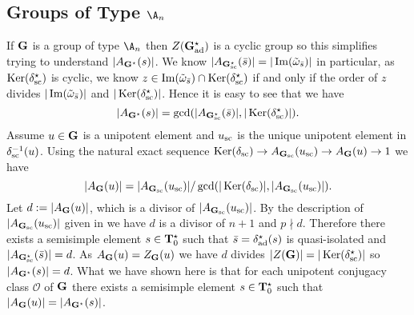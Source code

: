 \documentclass[eqthmnum]{jt-calcs}
\begin{document}
\subsection{\texorpdfstring{Groups of Type $\A_n$}{Groups of Type A}}
\begin{pa}\label{sec:comp-orders-type-A}
If $\mathbf{G}$ is a group of type $\A_n$ then $Z(\mathbf{G}_{\operatorname{ad}}^{\star})$ is a cyclic group so this simplifies trying to understand $|A_{\mathbf{G}^{\star}}(s)|$. We know $|A_{\mathbf{G}_{\operatorname{sc}}^{\star}}(\bar{s})| = |\operatorname{Im}(\tilde{\omega}_{\bar{s}})|$ in particular, as $\operatorname{Ker}(\delta_{\operatorname{sc}}^{\star})$ is cyclic, we know $z \in \operatorname{Im}(\tilde{\omega}_{\bar{s}}) \cap \operatorname{Ker}(\delta_{\operatorname{sc}}^{\star})$ if and only if the order of $z$ divides $|\operatorname{Im}(\tilde{\omega}_{\bar{s}})|$ and $|\operatorname{Ker}(\delta_{\operatorname{sc}}^{\star})|$. Hence it is easy to see that we have
\begin{equation*}
|A_{\mathbf{G}^{\star}}(s)| = \gcd(|A_{\mathbf{G}_{\operatorname{sc}}^{\star}}(\bar{s})|,|\operatorname{Ker}(\delta_{\operatorname{sc}}^{\star})|).
\end{equation*}
Assume $u \in \mathbf{G}$ is a unipotent element and $u_{\operatorname{sc}}$ is the unique unipotent element in $\delta_{\operatorname{sc}}^{-1}(u)$. Using the natural exact sequence $\operatorname{Ker}(\delta_{\operatorname{sc}}) \to A_{\mathbf{G}_{\operatorname{sc}}}(u_{\operatorname{sc}}) \to A_{\mathbf{G}}(u) \to 1$ we have
\begin{equation*}
|A_{\mathbf{G}}(u)| = |A_{\mathbf{G}_{\operatorname{sc}}}(u_{\operatorname{sc}})|/\gcd(|\operatorname{Ker}(\delta_{\operatorname{sc}})|,|A_{\mathbf{G}_{\operatorname{sc}}}(u_{\operatorname{sc}})|).
\end{equation*}
Let $d := |A_{\mathbf{G}}(u)|$, which is a divisor of $|A_{\mathbf{G}_{\operatorname{sc}}}(u_{\operatorname{sc}})|$. By the description of $|A_{\mathbf{G}_{\operatorname{sc}}}(u_{\operatorname{sc}})|$ given in \cite[\S10.3]{lusztig:1984:intersection-cohomology-complexes} we have $d$ is a divisor of $n+1$ and $p \nmid d$. Therefore there exists a semisimple element $s \in \mathbf{T}_0^{\star}$ such that $\bar{s} = \delta_{\operatorname{ad}}^{\star}(s)$ is quasi-isolated and $|A_{\mathbf{G}_{\operatorname{sc}}^{\star}}(\bar{s})| = d$. As $A_{\mathbf{G}}(u) = Z_{\mathbf{G}}(u)$ we have $d$ divides $|Z(\mathbf{G})| = |\operatorname{Ker}(\delta_{\operatorname{sc}}^{\star})|$ so $|A_{\mathbf{G}^{\star}}(s)| = d$. What we have shown here is that for each unipotent conjugacy class $\mathcal{O}$ of $\mathbf{G}$ there exists a semisimple element $s \in \mathbf{T}_0^{\star}$ such that $|A_{\mathbf{G}}(u)| = |A_{\mathbf{G}^{\star}}(s)|$.
\end{pa}
\end{document}
